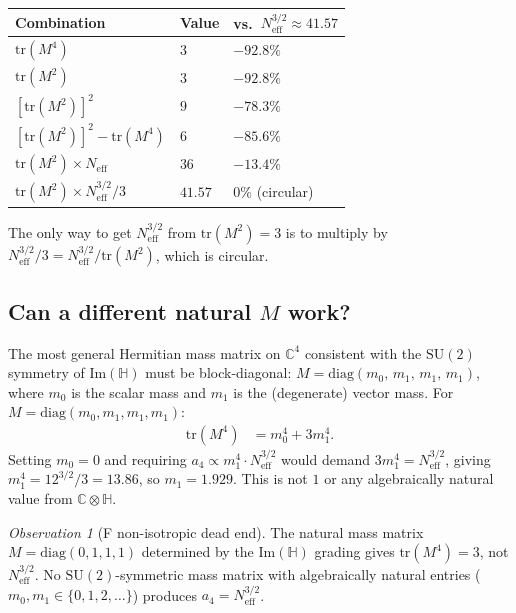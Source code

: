 \documentclass[11pt,a4paper]{article}
\theoremstyle{definition}
\theoremstyle{remark}
\newtheorem{observation}{Observation}
\begin{document}
\begin{center}
\begin{tabular}{lll}
  \toprule
  Combination & Value & vs.\ $N_{\mathrm{eff}}^{3/2} \approx 41.57$ \\
  \midrule
  $\mathrm{tr}(M^4)$ & $3$ & $-92.8\%$ \\
  $\mathrm{tr}(M^2)$ & $3$ & $-92.8\%$ \\
  $[\mathrm{tr}(M^2)]^2$ & $9$ & $-78.3\%$ \\
  $[\mathrm{tr}(M^2)]^2 - \mathrm{tr}(M^4)$ & $6$ & $-85.6\%$ \\
  $\mathrm{tr}(M^2) \times N_{\mathrm{eff}}$ & $36$ & $-13.4\%$ \\
  $\mathrm{tr}(M^2) \times N_{\mathrm{eff}}^{3/2}/3$ & $41.57$ & $0\%$ (circular) \\
  \bottomrule
\end{tabular}
\end{center}

The only way to get $N_{\mathrm{eff}}^{3/2}$ from $\mathrm{tr}(M^2) = 3$ is to
multiply by $N_{\mathrm{eff}}^{3/2}/3 = N_{\mathrm{eff}}^{3/2}/\mathrm{tr}(M^2)$,
which is circular.

\subsection{Can a different natural $M$ work?}

The most general Hermitian mass matrix on $\mathbb{C}^4$ consistent with
the $\mathrm{SU}(2)$ symmetry of $\mathrm{Im}(\mathbb{H})$ must be block-diagonal:
$M = \mathrm{diag}(m_0,\, m_1,\, m_1,\, m_1)$, where $m_0$ is the scalar
mass and $m_1$ is the (degenerate) vector mass.
For $M = \mathrm{diag}(m_0, m_1, m_1, m_1)$:
\begin{align}
  \mathrm{tr}(M^4) &= m_0^4 + 3 m_1^4. \label{eq:trM4_general}
\end{align}
Setting $m_0 = 0$ and requiring $a_4 \propto m_1^4 \cdot N_{\mathrm{eff}}^{3/2}$
would demand $3 m_1^4 = N_{\mathrm{eff}}^{3/2}$, giving $m_1^4 = 12^{3/2}/3
= 13.86$, so $m_1 = 1.929$.
This is not $1$ or any algebraically natural value from $\mathbb{C}\otimes\mathbb{H}$.

\begin{observation}[F non-isotropic dead end]
  \label{obs:F_noniso}
  The natural mass matrix $M = \mathrm{diag}(0,1,1,1)$ determined by the
  $\mathrm{Im}(\mathbb{H})$ grading gives $\mathrm{tr}(M^4) = 3$, not
  $N_{\mathrm{eff}}^{3/2}$.
  No $\mathrm{SU}(2)$-symmetric mass matrix with algebraically natural entries
  ($m_0, m_1 \in \{0,1,2,\ldots\}$) produces $a_4 = N_{\mathrm{eff}}^{3/2}$.
\end{observation}
\end{document}

